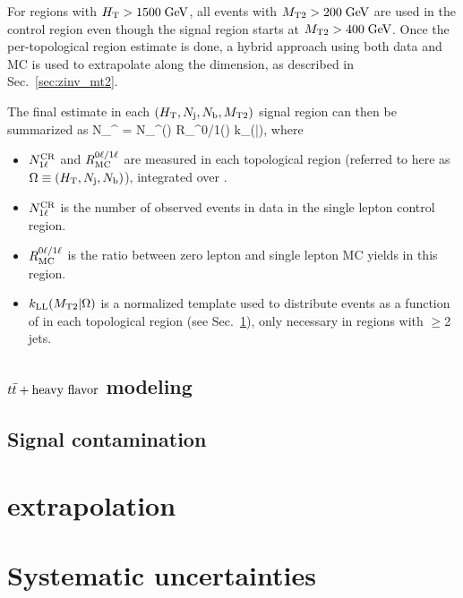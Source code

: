 For regions with $H_{\mathrm{T}}>1500\;\text{Ge\hspace{-.08em}V}$, all events with
$M_{\mathrm{T2}}>200\;\text{Ge\hspace{-.08em}V}$ are used in the control region even though the signal region starts at $M_{\mathrm{T2}}>400\;\text{Ge\hspace{-.08em}V}$.
Once the per-topological region estimate is done, a hybrid approach using both data and MC is
used to extrapolate along the \mttwo dimension, as described in Sec.~\ref{sec:zinv_mt2}.

The final estimate in each $(H_{\mathrm{T}},N_{\mathrm{j}},N_{\mathrm{b}},M_{\mathrm{T2}})$ signal region can then be summarized as
\be\label{eq:zinv_est}
N_{}^ = N_\mrm{1\ell}^(\Omega)\; R_^{0\ell/1\ell}(\Omega)\;
k_(\mttwo|\Omega),
\ee
where
\begin{itemize}\setlength\itemsep{0mm}
\item $N_{\mathrm{1\ell}}^{\mathrm{CR}}$ and $R_{\mathrm{MC}}^{0\ell/1\ell}$ are measured in each topological
region (referred to here as $\Omega\equiv(H_{\mathrm{T}},N_{\mathrm{j}},N_{\mathrm{b}})$), integrated over \mttwo.
\item $N_{\mathrm{1\ell}}^{\mathrm{CR}}$ is the number of observed events in data in the single lepton control region.
\item $R_{\mathrm{MC}}^{0\ell/1\ell}$ is the ratio between zero lepton and single lepton MC yields in this region.
\item $k_{\mathrm{LL}}(M_{\mathrm{T2}}|\Omega)$ is a normalized template used to distribute events as a function
of \mttwo in each topological region (see Sec.~\ref{sec:llep_mt2}), only necessary in regions with $\geq$2 jets.
\end{itemize}



\subsection{$t\bar{t}+\text{heavy flavor}$ modeling}
\label{sec:llep_ttbb}

\subsection{Signal contamination}

\section{\texorpdfstring{\mttwo}{MT2} extrapolation}
\label{sec:llep_mt2}

\section{Systematic uncertainties}
\label{sec:llep_syst}
